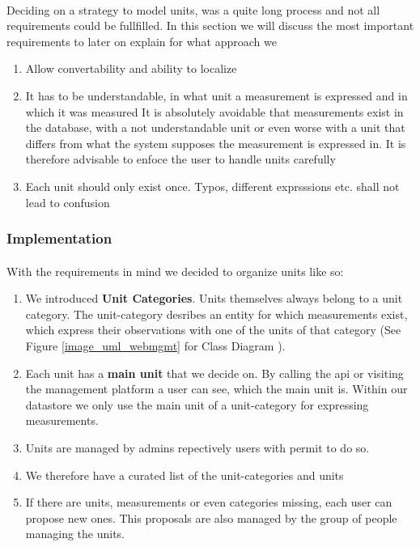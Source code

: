 \paragraph{}
Deciding on a strategy to model units, was a quite long process and not
all requirements could be fullfilled. In this section we will discuss
the most important requirements to later on explain for what approach we

\begin{enumerate}
	\def\labelenumi{\arabic{enumi}.}
	\item
	Allow convertability and ability to localize
	\item
	It has to be understandable, in what unit a measurement is expressed
	and in which it was measured It is absolutely avoidable that
	measurements exist in the database, with a not understandable unit or
	even worse with a unit that differs from what the system supposes the
	measurement is expressed in. It is therefore advisable to enfoce the
	user to handle units carefully
	\item
	Each unit should only exist once. Typos, different exprsssions etc.
	shall not lead to confusion
\end{enumerate}

\subsubsection{Implementation}\label{implementation}

\paragraph{}
With the requirements in mind we decided to organize units like so:

\begin{enumerate}
	\def\labelenumi{\arabic{enumi}.}
	\item
	We introduced \textbf{Unit Categories}. Units themselves always belong
	to a unit category. The unit-category desribes an entity for which
	measurements exist, which express their observations with one of the
	units of that category (See Figure \ref{image_uml_webmgmt} for Class Diagram ).
	\item
	Each unit has a \textbf{main unit} that we decide on. By calling the
	api or visiting the management platform a user can see, which the main
	unit is. Within our datastore we only use the main unit of a
	unit-category for expressing measurements.
	\item
	Units are managed by admins repectively users with permit to do so.
	\item
	We therefore have a curated list of the unit-categories and units
	\item
	If there are units, measurements or even categories missing, each user
	can propose new ones. This proposals are also managed by the group of
	people managing the units.
\end{enumerate}

